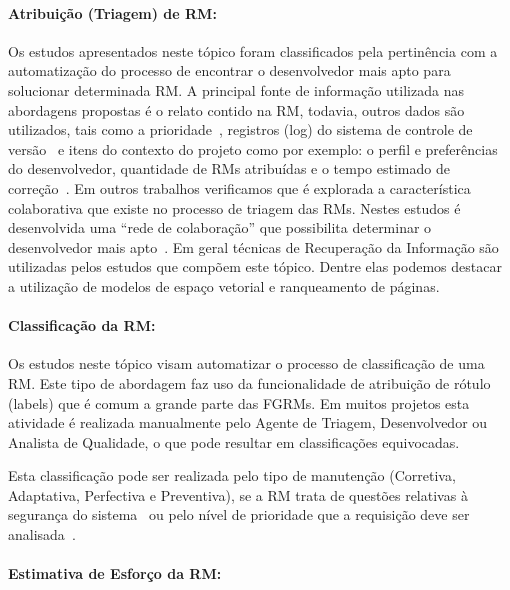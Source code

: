 \paragraph{Atribuição (Triagem) de RM:}

Os estudos apresentados neste tópico foram classificados pela pertinência com a
automatização do processo de encontrar o desenvolvedor mais apto para solucionar
determinada RM\@. A principal fonte de informação utilizada nas abordagens
propostas é o relato contido na RM, todavia, outros dados são utilizados, tais
como a prioridade~\cite{tian2015automated}, registros (log) do sistema de
controle de versão~\cite{shokripour2012automatic, Hu:2014:EBT:2707683.2708297} e
itens do contexto do projeto como por exemplo: o perfil e preferências do
desenvolvedor, quantidade de RMs atribuídas e o tempo estimado de
correção~\cite{hosseini2012market}. Em outros trabalhos verificamos que é
explorada a característica colaborativa que existe no processo de triagem das
RMs. Nestes estudos é desenvolvida uma ``rede de colaboração'' que possibilita
determinar o desenvolvedor mais apto~\cite{Zhang2014,Zanetti2013, Wu2011}.  Em
geral técnicas de Recuperação da Informação são utilizadas pelos estudos que
compõem este tópico. Dentre elas podemos destacar a utilização de modelos de
espaço vetorial e ranqueamento de páginas.


\paragraph{Classificação da RM:}

Os estudos neste tópico visam automatizar o processo de clas\-si\-fi\-ca\-ção de
uma RM\@.  Este tipo de abordagem faz uso da funcionalidade de atribuição de
rótulo (labels) que é comum  a grande parte das FGRMs. Em muitos projetos esta
atividade é realizada manualmente pelo Agente de Triagem, Desenvolvedor ou
Analista de Qualidade, o que pode resultar em classificações equivocadas.

Esta classificação pode ser realizada pelo tipo de manutenção (Corretiva,
Adaptativa, Perfectiva e Preventiva), se a RM trata de questões relativas à
segurança do sistema~\cite{gegick2010identifying, behl2014bug} ou pelo nível de
prioridade que a requisição deve ser analisada~\cite{behl2014bug}.

\paragraph{Estimativa de Esforço da RM:}


